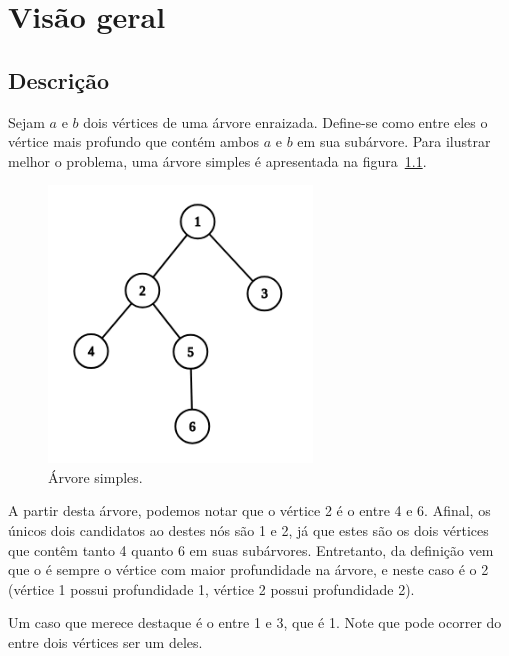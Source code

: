 \chapter{Visão geral}
\label{cap:visao-geral}

\section{Descrição}

Sejam $a$ e $b$ dois vértices de uma árvore enraizada. Define-se como \LCA entre eles o vértice mais profundo que contém ambos $a$ e $b$ em sua subárvore. Para ilustrar melhor o problema, uma árvore simples é apresentada na figura~\ref{fig:grafo-simples}.

\begin{figure}[htb]
\begin{center}
\includegraphics[width=7cm]{images/graph}
\end{center}
\caption{\label{fig:grafo-simples}Árvore simples.}
\end{figure}

A partir desta árvore, podemos notar que o vértice 2 é o \LCA entre 4 e 6. Afinal, os únicos dois candidatos ao \LCA destes nós são 1 e 2, já que estes são os dois vértices que contêm tanto 4 quanto 6 em suas subárvores. Entretanto, da definição vem que o \LCA é sempre o vértice com maior profundidade na árvore, e neste caso é o 2 (vértice 1 possui profundidade 1, vértice 2 possui profundidade 2).

Um caso que merece destaque é o \LCA entre 1 e 3, que é 1. Note que pode ocorrer do \LCA entre dois vértices ser um deles.

\vspace{50px}

